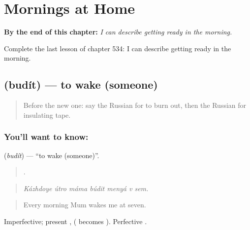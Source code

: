 
\chapter{Mornings at Home}
\label{ch:ru-mornings-at-home}

\begin{chapteropening}
\textbf{By the end of this chapter:} \emph{I can describe getting ready in the morning.}

Complete the last lesson of chapter 534: I can describe getting ready in the morning.
\end{chapteropening}

\section[\texorpdfstring{\ru{будить} (budít)}{будить (budít)}]{ (budít) — to wake (someone)}

\label{lesson:RU-C534-budit}



\begin{quote}
Before the new one: say the Russian for to burn out, then the Russian for insulating tape.
\end{quote}

\subsection*{You'll want to know: }
\textbf{} (\emph{budít}) — \textquotedblleft{}to wake (someone)\textquotedblright{}.

\begin{quote}
      .
\end{quote}

\begin{quote}
\emph{Kázhdoye útro máma búdit menyá v sem.}
\end{quote}

\begin{quote}
Every morning Mum wakes me at seven.
\end{quote}

Imperfective; present ,  ( becomes ). Perfective .

